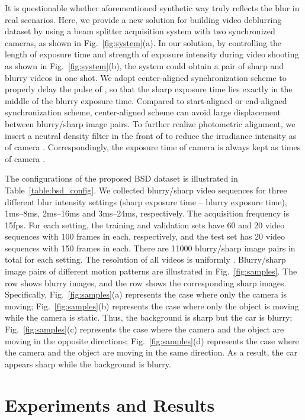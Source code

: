 \documentclass[twocolumn]{svjour3}          \smartqed  \usepackage{graphicx}
\begin{document}
It is questionable whether aforementioned synthetic way truly reflects the blur in real scenarios. Here, we provide a new solution for building video deblurring dataset by using a beam splitter acquisition system with two synchronized cameras, as shown in Fig.~\ref{fig:system}(a). In our solution, by controlling the length of exposure time and strength of exposure intensity during video shooting as shown in Fig.~\ref{fig:system}(b), the system could obtain a pair of sharp and blurry videos in one shot. We adopt center-aligned synchronization scheme to properly delay the pulse of , so that the sharp exposure time lies exactly in the middle of the blurry exposure time. Compared to start-aligned or end-aligned synchronization scheme, center-aligned scheme can avoid large displacement between blurry/sharp image pairs. To further realize photometric alignment, we insert a  neutral density filter in the front of  to reduce the irradiance intensity as  of camera . Correspondingly, the exposure time of camera  is always kept as  times of camera .

The configurations of the proposed BSD dataset is illustrated in Table~\ref{table:bsd_config}. We collected blurry/sharp video sequences for three different blur intensity settings (sharp exposure time -- blurry exposure time), 1ms--8ms, 2ms--16ms and 3ms--24ms, respectively. The acquisition frequency is 15fps. For each setting, the training and validation sets have 60 and 20 video sequences with 100 frames in each, respectively, and the test set has 20 video sequences with 150 frames in each. There are 11000 blurry/sharp image pairs in total for each setting. The resolution of all videos is uniformly . Blurry/sharp image pairs of different motion patterns are illustrated in Fig.~\ref{fig:samples}. The  row shows blurry images, and the  row shows the corresponding sharp images. Specifically, Fig.~\ref{fig:samples}(a) represents the case where only the camera is moving; Fig.~\ref{fig:samples}(b) represents the case where only the object is moving while the camera is static. Thus, the background is sharp but the car is blurry; Fig.~\ref{fig:samples}(c) represents the case where the camera and the object are moving in the opposite directions; Fig.~\ref{fig:samples}(d) represents the case where the camera and the object are moving in the same direction. As a result, the car appears sharp while the background is blurry.

\section{Experiments and Results}
\end{document}
